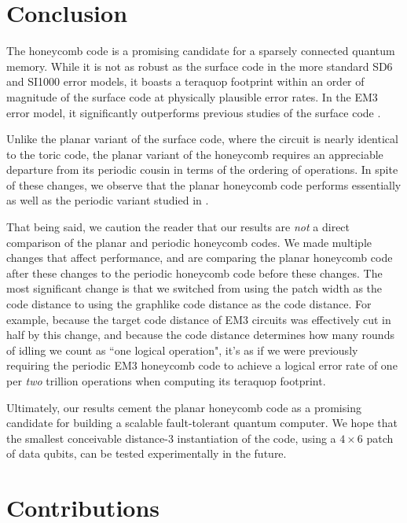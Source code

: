 \documentclass[onecolumn,a4paper,accepted=2022-09-12]{quantumarticle}
\theoremstyle{definition}
\theoremstyle{definition}
\theoremstyle{definition}
\begin{document}
\section{Conclusion}
\label{sec:conclusion}

The honeycomb code is a promising candidate for a sparsely connected quantum memory.  
While it is not as robust as the surface code in the more standard SD6 and SI1000 error models, it boasts a teraquop footprint within an order of magnitude of the surface code at physically plausible error rates.  
In the EM3 error model, it significantly outperforms previous studies of the surface code \cite{chao2020optimization}.

Unlike the planar variant of the surface code, where the circuit is nearly identical to the toric code, the planar variant of the honeycomb requires an appreciable departure from its periodic cousin in terms of the ordering of operations.
In spite of these changes, we observe that the planar honeycomb code performs essentially as well as the periodic variant studied in \cite{gidney2021honeycombmemory}.

That being said, we caution the reader that our results are \emph{not} a direct comparison of the planar and periodic honeycomb codes.
We made multiple changes that affect performance, and are comparing the planar honeycomb code after these changes to the periodic honeycomb code before these changes.
The most significant change is that we switched from using the patch width as the code distance to using the graphlike code distance as the code distance.
For example, because the target code distance of EM3 circuits was effectively cut in half by this change, and because the code distance determines how many rounds of idling we count as ``one logical operation", it's as if we were previously requiring the periodic EM3 honeycomb code to achieve a logical error rate of one per \emph{two} trillion operations when computing its teraquop footprint.

Ultimately, our results cement the planar honeycomb code as a promising candidate for building a scalable fault-tolerant quantum computer.
We hope that the smallest conceivable distance-3 instantiation of the code, using a $4\times6$ patch of data qubits, can be tested experimentally in the future.

\section{Contributions}
\end{document}
